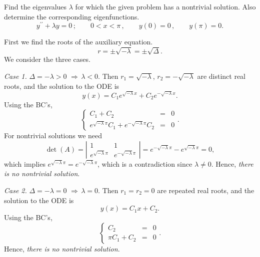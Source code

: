 \documentclass[11pt]{article}
\begin{document}
\begin{problem}
Find the eigenvalues $\lambda$ for which the given problem has a nontrivial solution. Also determine the corresponding eigenfunctions.
\begin{equation*}
y^{\prime \prime} + \lambda y =0\,; \qquad  0<x<\pi \,, \qquad y(0)=0  \,,\qquad y(\pi) =0. 
\end{equation*}
\end{problem}
\begin{solution}
First we find the roots of the auxiliary equation.
\[r=\pm\sqrt{-\lambda}=\pm\sqrt{\Delta}.\]
We consider the three cases.

\par \textsl{Case 1.} $\Delta = -\lambda >0 \,\, \Rightarrow \, \lambda<0.$ Then $r_{1}=\sqrt{-\lambda}$, $r_{2}=-\sqrt{-\lambda}$ are distinct real roots, and the solution to the ODE is
\[y(x)=C_{1}e^{\sqrt{-\lambda}x}+C_{2}e^{-\sqrt{-\lambda}x}.\]
Using the BC's,
\begin{equation*}
\left\{\begin{array}{rcl}
       C_{1} +C_{2}&=&0\\
      e^{\sqrt{-\lambda}\pi} C_{1} +  e^{-\sqrt{-\lambda}\pi}C_{2}& = &0
      \end{array}\right. .
\end{equation*}
For nontrivial solutions we need 
$$\det(A)=\left|\begin{matrix}1&1\\ e^{\sqrt{-\lambda}\pi} & e^{-\sqrt{-\lambda}\pi}\end{matrix}\right|=e^{-\sqrt{-\lambda}\pi}-e^{\sqrt{-\lambda}\pi}=0,$$ 
which implies $e^{\sqrt{-\lambda}\pi}=e^{-\sqrt{-\lambda}\pi}$, which is a contradiction since $\lambda\neq 0$. Hence, \textsl{there is no nontrivial solution}.

\par \textsl{Case 2.} $\Delta = -\lambda =0 \,\, \Rightarrow \, \lambda=0.$ Then $r_{1}=r_{2}=0$ are repeated real roots, and the solution to the ODE is
\[y(x)=C_{1}x+C_{2}.\]
Using the BC's,
\begin{equation*}
\left\{\begin{array}{rcl}
       C_{2} & = & 0\\
       \pi C_{1} + C_{2} & = & 0
      \end{array}\right. .
\end{equation*}
Hence, \textsl{there is no nontrivial solution}.


\end{solution}
\end{document}
